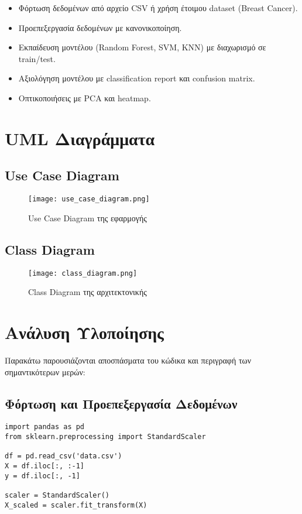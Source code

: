 \documentclass[a4paper,12pt]{article}
\begin{document}
\begin{itemize}
    \item Φόρτωση δεδομένων από αρχείο CSV ή χρήση έτοιμου dataset (Breast Cancer).
    \item Προεπεξεργασία δεδομένων με κανονικοποίηση.
    \item Εκπαίδευση μοντέλου (Random Forest, SVM, KNN) με διαχωρισμό σε train/test.
    \item Αξιολόγηση μοντέλου με classification report και confusion matrix.
    \item Οπτικοποιήσεις με PCA και heatmap.
\end{itemize}

\section{UML Διαγράμματα}

\subsection{Use Case Diagram}
\begin{figure}[h]
  \centering
  \texttt{[image: use\_case\_diagram.png]}
  \caption{Use Case Diagram της εφαρμογής}
\end{figure}

\subsection{Class Diagram}
\begin{figure}[h]
  \centering
  \texttt{[image: class\_diagram.png]}
  \caption{Class Diagram της αρχιτεκτονικής}
\end{figure}

\section{Ανάλυση Υλοποίησης}

Παρακάτω παρουσιάζονται αποσπάσματα του κώδικα και περιγραφή των σημαντικότερων μερών:

\subsection{Φόρτωση και Προεπεξεργασία Δεδομένων}
\begin{lstlisting}
import pandas as pd
from sklearn.preprocessing import StandardScaler

df = pd.read_csv('data.csv')
X = df.iloc[:, :-1]
y = df.iloc[:, -1]

scaler = StandardScaler()
X_scaled = scaler.fit_transform(X)
\end{lstlisting}
\end{document}
